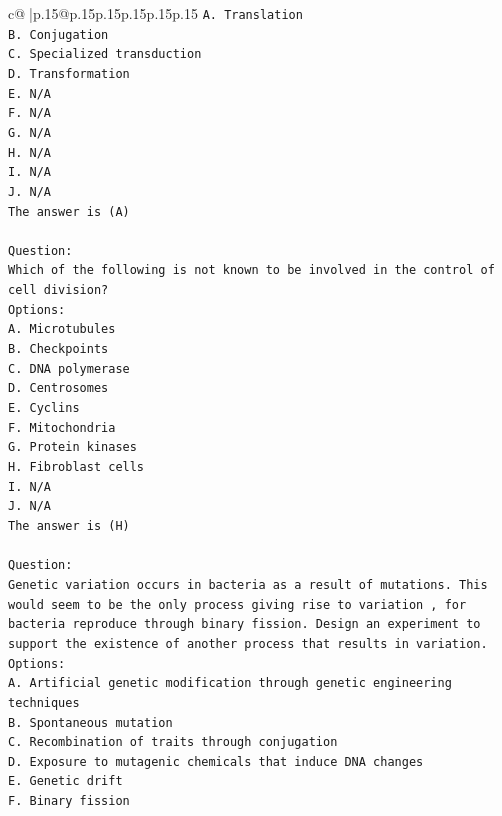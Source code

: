 \documentclass{article}
\begin{document}
{\begin{supertabular}{c@{$\;$}|p{.15\linewidth}@{}p{.15\linewidth}p{.15\linewidth}p{.15\linewidth}p{.15\linewidth}p{.15\linewidth}}
{{{\texttt{A. Translation} \\
\texttt{B. Conjugation} \\
\texttt{C. Specialized transduction} \\
\texttt{D. Transformation} \\
\texttt{E. N/A} \\
\texttt{F. N/A} \\
\texttt{G. N/A} \\
\texttt{H. N/A} \\
\texttt{I. N/A} \\
\texttt{J. N/A} \\
\texttt{The answer is (A)} \\
\\ 
\texttt{Question:} \\
\texttt{Which of the following is not known to be involved in the control of cell division?} \\
\texttt{Options:} \\
\texttt{A. Microtubules} \\
\texttt{B. Checkpoints} \\
\texttt{C. DNA polymerase} \\
\texttt{D. Centrosomes} \\
\texttt{E. Cyclins} \\
\texttt{F. Mitochondria} \\
\texttt{G. Protein kinases} \\
\texttt{H. Fibroblast cells} \\
\texttt{I. N/A} \\
\texttt{J. N/A} \\
\texttt{The answer is (H)} \\
\\ 
\texttt{Question:} \\
\texttt{Genetic variation occurs in bacteria as a result of mutations. This would seem to be the only process giving rise to variation , for bacteria reproduce through binary fission. Design an experiment to support the existence of another process that results in variation.} \\
\texttt{Options:} \\
\texttt{A. Artificial genetic modification through genetic engineering techniques} \\
\texttt{B. Spontaneous mutation} \\
\texttt{C. Recombination of traits through conjugation} \\
\texttt{D. Exposure to mutagenic chemicals that induce DNA changes} \\
\texttt{E. Genetic drift} \\
\texttt{F. Binary fission} \\
            }
        }
    }
     \\ \\


\end{supertabular}}
\end{document}
